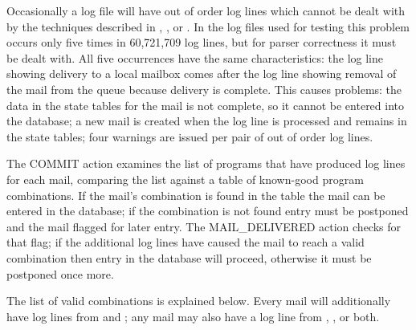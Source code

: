 Occasionally a log file will have out of order log lines which cannot be
dealt with by the techniques described in , , or .  In the \numberOFlogFILES{} log files used for
testing this problem occurs only five times in 60,721,709 log lines, but
for parser correctness it must be dealt with.  All five occurrences have
the same characteristics: the  log line showing delivery to a
local mailbox comes after the  log line showing removal of the
mail from the queue because delivery is complete.  This causes problems:
the data in the state tables for the mail is not complete, so it cannot be
entered into the database; a new mail is created when the 
log line is processed and remains in the state tables; four warnings are
issued per pair of out of order log lines.

The COMMIT action examines the list of programs that have produced log lines
for each mail, comparing the list against a table of known-good program
combinations.  If the mail's combination is found in the table the mail can be
entered in the database; if the combination is not found entry must be
postponed and the mail flagged for later entry.  The MAIL\_DELIVERED action
checks for that flag; if the additional log lines have caused the mail to reach
a valid combination then entry in the database will proceed, otherwise it must
be postponed once more.

The list of valid combinations is explained below.  Every mail will
additionally have log lines from  and ; any
mail may also have a log line from , , or
both.

